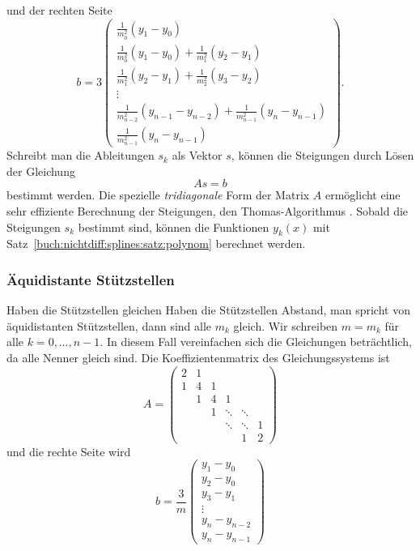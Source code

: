und der rechten Seite
\begin{equation}
\renewcommand{\arraystretch}{1.9}
b
=
3
\begin{pmatrix}
\displaystyle
\frac{1}{m_0^2}(y_1-y_0)
\\
\displaystyle
\frac{1}{m_0^2}(y_1-y_0)
+
\frac{1}{m_1^2}(y_2-y_1)
\\
\displaystyle
\frac{1}{m_1^2}(y_2-y_1)
+
\frac{1}{m_2^2}(y_3-y_2)
\\
\vdots
\\
\displaystyle
\frac{1}{m_{n-2}^2}(y_{n-1}-y_{n-2})
+
\frac{1}{m_{n-1}^2}(y_n-y_{n-1})
\\
\displaystyle
\frac{1}{m_{n-1}^2}(y_n-y_{n-1})
\end{pmatrix}.
\label{buch:nichtdiff:splines:eqn:vektorb}
\end{equation}
Schreibt man die Ableitungen $s_k$ als Vektor $s$, können die Steigungen
durch Lösen der Gleichung
\begin{equation}
As=b
\label{buch:nichtdiff:splines:eqn:gleichungssystem}
\end{equation}
bestimmt werden.
Die spezielle {\em tridiagonale} Form der Matrix $A$
%
ermöglicht eine sehr effiziente Berechnung der Steigungen, den
Thomas-Algorithmus \cite{buch:thomas}.
%
Sobald die Steigungen $s_k$ bestimmt sind, können die Funktionen
$y_k(x)$ mit Satz~\ref{buch:nichtdiff:splines:satz:polynom}
berechnet werden.

%
%
\subsubsection{Äquidistante Stützstellen}
Haben die Stützstellen gleichen Haben die Stützstellen Abstand, man
spricht von äquidistanten Stützstellen, dann sind alle $m_k$ gleich.
Wir schreiben $m=m_k$ für alle $k=0,\dots,n-1$.
In diesem Fall vereinfachen sich die Gleichungen beträchtlich, da
alle Nenner gleich sind.
Die Koeffizientenmatrix des Gleichungssystems ist
\[
A
=
\begin{pmatrix}
2 &1 &  &       &       &  \\
1 &4 &1 &       &       &  \\
  &1 &4 &1      &       &  \\[-3pt]
  &  &1 &\ddots &\ddots &  \\[-3pt]
  &  &  &\ddots &\ddots &1 \\
  &  &  &       &1      &2
\end{pmatrix}
\]
und die rechte Seite wird
\[
b
=
\frac{3}{m}
\begin{pmatrix}
y_1-y_0\\
y_2-y_0\\
y_3-y_1\\[-3pt]
\vdots\\
y_n-y_{n-2}\\
y_n-y_{n-1}
\end{pmatrix}
\]

